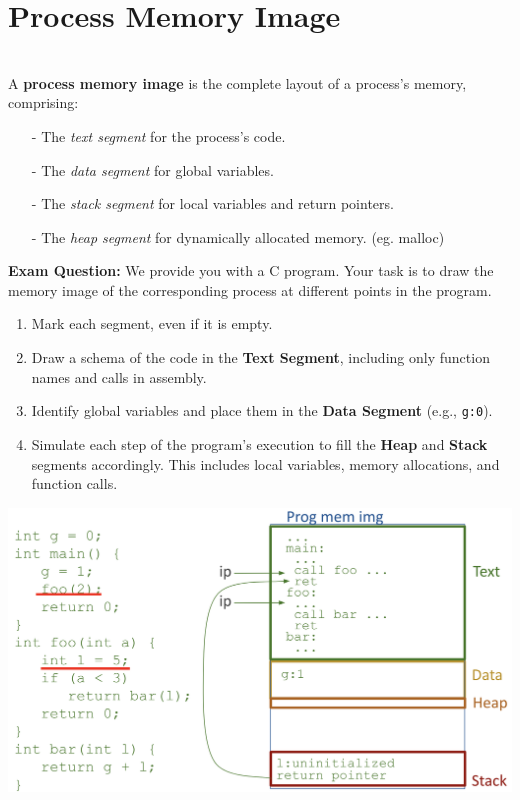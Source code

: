 \section{Process Memory Image}
\begin{definition}
  \leavevmode\\[5px]
A \textbf{process memory image} is the complete layout of a process's memory, comprising:
\begin{itemize}
  \item[-] The \emph{text segment} for the process's code.
  \item[-] The \emph{data segment} for global variables.
  \item[-] The \emph{stack segment} for local variables and return pointers.
  \item[-] The \emph{heap segment} for dynamically allocated memory. (eg. malloc)
\end{itemize}
\end{definition}

\vspace{10px}
\noindent
\begin{minipage}{0.45\textwidth}
  \textbf{Exam Question:} We provide you with a C program. Your task is to draw the memory image of the corresponding process at different points in the program.
\begin{enumerate}
    \item Mark each segment, even if it is empty.
    \item Draw a schema of the code in the \textbf{Text Segment}, including only function names and calls in assembly.
    \item Identify global variables and place them in the \textbf{Data Segment} (e.g., \texttt{g:0}).
    \item Simulate each step of the program’s execution to fill the \textbf{Heap} and \textbf{Stack} segments accordingly. This includes local variables, memory allocations, and function calls.
\end{enumerate}
\end{minipage}
\hfill
\vline
\hfill
\begin{minipage}{0.45\textwidth}
    \begin{center}
    \includegraphics[width=1.23\textwidth]{chapters/L4/images/exam.png}
\end{center}
\end{minipage} \\[30px]

